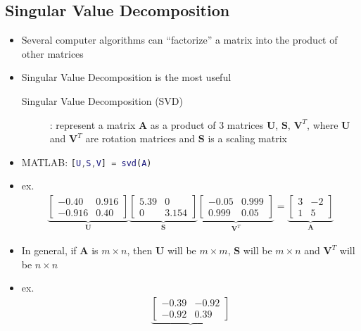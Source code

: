 \documentclass[letterpaper,12pt]{article}
\newcommand{\matr}[1]{\mathbf{#1}}
\begin{document}
\subsection{Singular Value Decomposition}
\begin{itemize}
 \item Several computer algorithms can ``factorize'' a matrix into the product of other matrices
 \item Singular Value Decomposition is the most useful
       \begin{description}
        \item[Singular Value Decomposition (SVD)]: represent a matrix $\matr{A}$ as a product of 3 matrices $\matr{U}$, $\matr{S}$, $\matr{V}^T$, where $\matr{U}$ and $\matr{V}^T$ are rotation matrices and $\matr{S}$ is a scaling matrix
       \end{description}
 \item MATLAB: \lstinline[language=matlab]{[U,S,V] = svd(A)}
 \item ex.
       \begin{align}
        \underbrace{\begin{bmatrix}
          -0.40  & 0.916 \\
          -0.916 & 0.40
         \end{bmatrix}}_{\matr{U}}
        \underbrace{\begin{bmatrix}
          5.39 & 0     \\
          0    & 3.154
         \end{bmatrix}}_{\matr{S}}
        \underbrace{\begin{bmatrix}
          -0.05 & 0.999 \\
          0.999 & 0.05
         \end{bmatrix}}_{\matr{V}^T}
        = \underbrace{\begin{bmatrix}
          3 & -2 \\
          1 & 5
         \end{bmatrix}}_{\matr{A}}
       \end{align}
 \item In general, if $\matr{A}$ is $m \times n$, then $\matr{U}$ will be $m \times m$, $\matr{S}$ will be $m \times n$ and $\matr{V}^T$ will be $n \times n$
 \item ex.
       \begin{align}
        \underbrace{\begin{bmatrix}
          -0.39 & -0.92 \\
          -0.92 & 0.39

\end{bmatrix}}
\end{align}
\end{itemize}
\end{document}
